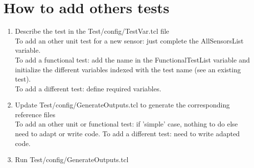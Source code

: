 \documentclass[a4paper,11pt]{article}
\begin{document}
\section{How to add others tests}
\begin{enumerate}
\item Describe the test in the Test/config/TestVar.tcl file\\
To add an other unit test for a new sensor: just complete the AllSensorsList variable.\\
To add a functional test: add the name in the FunctionalTestList variable and initialize the different variables indexed with the test name (see an existing test).\\
To add a different test: define required variables.\\
\item Update Test/config/GenerateOutputs.tcl to generate the corresponding reference files\\
To add an other unit or functional test: if 'simple' case, nothing to do else need to adapt or write code.
To add a different test: need to write adapted code.
\item Run Test/config/GenerateOutputs.tcl
\end{enumerate}
\end{document}
